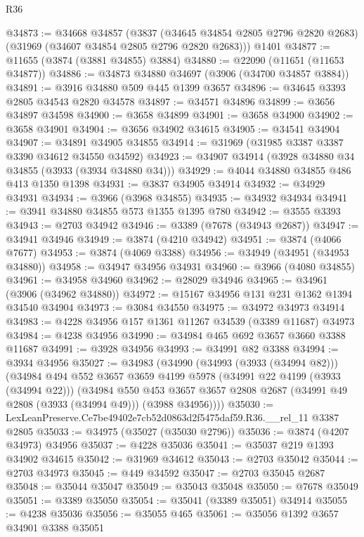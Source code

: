 \begin{lexlean}{R36}
\begin{coremodule}
@34873 := @34668
    @34857
    (@3837 (@34645 @34854 @2805 @2796 @2820 @2683) (@31969 (@34607 @34854 @2805 @2796 @2820 @2683)))
    @1401
@34877 := @11655 (@3874 (@3881 @34855) @3884)
@34880 := @22090 (@11651 (@11653 @34877))
@34886 := @34873 @34880 @34697 (@3906 (@34700 @34857 @3884))
@34891 := @3916 @34880 @509 @445 @1399 @3657
@34896 := @34645 @3393 @2805 @34543 @2820 @34578
@34897 := @34571 @34896
@34899 := @3656 @34897 @34598
@34900 := @3658 @34899
@34901 := @3658 @34900
@34902 := @3658 @34901
@34904 := @3656 @34902 @34615
@34905 := @34541 @34904
@34907 := @34891 @34905 @34855
@34914 := @31969 (@31985 @3387 @3387 @3390 @34612 @34550 @34592)
@34923 := @34907 @34914 (@3928 @34880 @34 @34855 (@3933 (@3934 @34880 @34)))
@34929 := @4044 @34880 @34855 @486 @413 @1350 @1398
@34931 := @3837 @34905 @34914
@34932 := @34929 @34931
@34934 := @3966 (@3968 @34855)
@34935 := @34932 @34934
@34941 := @3941 @34880 @34855 @573 @1355 @1395 @780
@34942 := @3555 @3393
@34943 := @2703 @34942
@34946 := @3389 (@7678 (@34943 @2687))
@34947 := @34941 @34946
@34949 := @3874 (@4210 @34942)
@34951 := @3874 (@4066 @7677)
@34953 := @3874 (@4069 @3388)
@34956 := @34949 (@34951 (@34953 @34880))
@34958 := @34947 @34956 @34931
@34960 := @3966 (@4080 @34855)
@34961 := @34958 @34960
@34962 := @28029 @34946
@34965 := @34961 (@3906 (@34962 @34880))
@34972 := @15167 @34956 @131 @231 @1362 @1394 @34540 @34904
@34973 := @3084 @34550
@34975 := @34972 @34973 @34914
@34983 := @4228 @34956 @157 @1361 @11267 @34539 (@3389 @11687) @34973
@34984 := @4238 @34956
@34990 := @34984 @465 @692 @3657 @3660 @3388 @11687
@34991 := @3928 @34956
@34993 := @34991 @82 @3388
@34994 := @3934 @34956
@35027 := @34983
    (@34990
      (@34993 (@3933 (@34994 @82)))
      (@34984
        @494
        @552
        @3657
        @3659
        @4199
        @5978
        (@34991 @22 @4199 (@3933 (@34994 @22)))
        (@34984
          @550
          @453
          @3657
          @3657
          @2808
          @2687
          (@34991 @49 @2808 (@3933 (@34994 @49)))
          (@3988 @34956))))
@35030 := LexLeanPreserve.Ce7be49402e7cb52d0863d2f5475daf59.R36.__rel_11 @3387 @2805
@35033 := @34975 (@35027 (@35030 @2796))
@35036 := @3874 (@4207 @34973) @34956
@35037 := @4228 @35036
@35041 := @35037 @219 @1393 @34902 @34615
@35042 := @31969 @34612
@35043 := @2703 @35042
@35044 := @2703 @34973
@35045 := @449 @34592
@35047 := @2703 @35045 @2687
@35048 := @35044 @35047
@35049 := @35043 @35048
@35050 := @7678 @35049
@35051 := @3389 @35050
@35054 := @35041 (@3389 @35051) @34914
@35055 := @4238 @35036
@35056 := @35055 @465
@35061 := @35056 @1392 @3657 @34901 @3388 @35051

\end{coremodule}
\end{lexlean}
